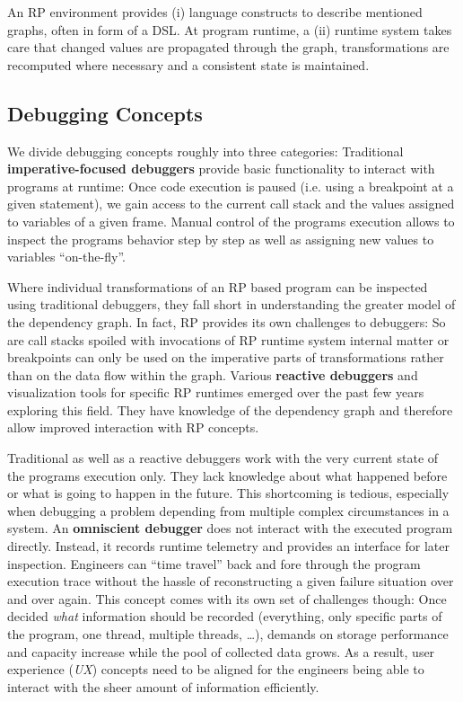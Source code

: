 \documentclass[12pt,a4paper]{article}
\begin{document}
An RP environment provides (i) language constructs to describe mentioned graphs, often in form of a DSL\cite{10.1145/2577080.2577083}. At program runtime, a (ii) runtime system takes care that changed values are propagated through the graph, transformations are recomputed where necessary and a consistent state is maintained.

\subsection{Debugging Concepts}

We divide debugging concepts roughly into three categories: Traditional \textbf{imperative-focused debuggers} provide basic functionality to interact with programs at runtime: Once code execution is paused (i.e. using a breakpoint at a given statement), we gain access to the current call stack and the values assigned to variables of a given frame. Manual control of the programs execution allows to inspect the programs behavior step by step as well as assigning new values to variables ``on-the-fly''.

Where individual transformations of an RP based program can be inspected using traditional debuggers, they fall short in understanding the greater model of the dependency graph. In fact, RP provides its own challenges to debuggers: So are call stacks spoiled with invocations of RP runtime system internal matter or breakpoints can only be used on the imperative parts of transformations rather than on the data flow within the graph. Various \textbf{reactive debuggers} and visualization tools for specific RP runtimes emerged over the past few years \cite{10.1145/2884781.2884815} \cite{10.1145/3180155.3180156} \cite{rxviz} exploring this field. They have knowledge of the dependency graph and therefore allow improved interaction with RP concepts.

Traditional as well as a reactive debuggers work with the very current state of the programs execution only. They lack knowledge about what happened before or what is going to happen in the future. This shortcoming is tedious, especially when debugging a problem depending from multiple complex circumstances in a system. An \textbf{omniscient debugger} \cite{5287015} \cite{DBLP:journals/corr/OCallahanJFHNP17} does not interact with the executed program directly. Instead, it records runtime telemetry and provides an interface for later inspection. Engineers can ``time travel'' back and fore through the program execution trace without the hassle of reconstructing a given failure situation over and over again. This concept comes with its own set of challenges though: Once decided \emph{what} information should be recorded (everything, only specific parts of the program, one thread, multiple threads, \dots), demands on storage performance and capacity increase while the pool of collected data grows. As a result, user experience (\emph{UX}) concepts need to be aligned for the engineers being able to interact with the sheer amount of information efficiently.
\end{document}
